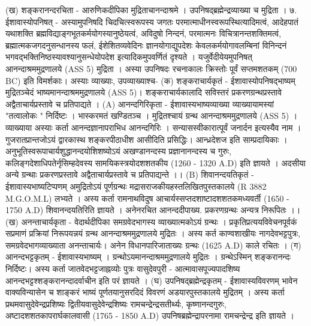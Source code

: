 (ख) शङ्करानन्दरचिता - आरुणिकदीपिका 
मुद्रिताचानन्दाश्रमे । उपनिषद्ब्रह्मेन्द्रव्याख्या च मुद्रिता । 
७. ईशावास्योपनिषत् - 
अस्यामुपनिषदि चिदचित्स्वरूपस्य जगतः परमात्माधीनस्वरूपस्थित्यादिमत्वं, आदेहपातं यथाशक्ति ब्रह्मविद्याङ्गभूतकर्मयोगस्यानुष्ठेयत्वं, अविदुषो निन्दनं, परमात्मनः विचित्रानन्तशक्तिमत्वं, ब्रह्मात्मकजगदनुसन्धानस्य फलं, ईशेशितव्यवेदिनः ज्ञानयोगाद्युपदेशः केवलकर्मयोगावलम्बिनां विनिन्दनं भगवद्भक्तिनिष्ठस्यावश्यानुसन्धेयोपदेश इत्यादिकमुपवर्णितं दृश्यते । यजुर्वेदीयेयमुपनिषत् आनन्दाश्रममुद्रणालये (ASS 5) मुद्रिता । अस्या उपनिषदः रचनाकालः क्रिस्तोः पूर्वं सप्तमशतकम् (700 BC) इति विमर्शकाः। अस्याः व्याख्याः, उपव्याख्याश्च- 
(क) शङ्कराचार्यकृतं - ईशावास्योपनिषद्भाष्यम् 
मुद्रितञ्चेदं भाष्यमानन्दाश्रममुद्रणालये (ASS 5)। शङ्कराचार्यकालादि सविस्तरं प्रकरणग्रन्थप्रस्तावे अद्वैताचार्यप्रस्तावे च प्रतिपाद्यते । 
(A) आनन्दगिरिकृता - ईशावास्यभाष्यव्याख्या
व्याख्यायामस्यां "तत्वालोकः " निर्दिष्टः । भास्करमतं खण्डितञ्च । मुद्रितश्चायं ग्रन्थ आनन्दाश्रममुद्रणालये (ASS 5) ।
व्याख्याया अस्याः कर्ता आनन्दज्ञानापराभिध आनन्दगिरिः । सन्यासस्वीकारात्पूर्वं जनार्दन इत्यस्यैव नाम । गुजरातप्रान्तजोऽयं द्वारकास्थ शङ्करपीठाधीश आसीदिति प्रसिद्धिः। आन्ध्रदेशज इति साम्प्रदायिकाः । अनुभूतिस्वरूपाचार्यशुद्धानन्दयोशिशष्योऽयं अखण्डानन्दस्य प्रज्ञानानन्दस्य च गुरुः, कलिङ्गदेशाधिपतेर्नृसिम्हदेवस्य सामयिकस्त्रयोदशशतकीय (1260 - 1320 A.D) इति ज्ञायते । अदसीया अन्ये ग्रन्थाः प्रकरणप्रस्तावे अद्वैताचार्यप्रस्तावे च प्रतिपाद्यन्ते ।। 
(B) शिवानन्दयतिकृतं - ईशावास्यभाष्यटिप्पणम् 
अमुद्रितोऽयं पूर्णग्रन्थः मद्रासराजकीयहस्तलिखितपुस्तकालये (R 3882 M.G.O.M.L) लभ्यते ।
अस्य कर्ता रामनाथविदुष आचार्यस्सप्तदशाष्टादशशतकमध्यवर्ती (1650 - 1750 A.D) शिवानन्दयतिरिति ज्ञायते । अनेनरचित आनन्ददीपाख्य. प्रकरणग्रन्थः अन्यत्र निरूपितः ।। 
(ख) अनन्ताचार्यकृता - वेदार्थदीपिका 
समग्रवेदभागस्य व्याख्यात्मकोऽयं ग्रन्थः । प्रकृतिप्रत्ययविवेचनपूर्वकं सप्रमाणं प्रक्रियां निरूपयन्नयं ग्रन्थ आनन्दाश्रममुद्रणालये मुद्रितः । 
अस्य कर्त काण्वशाखीयः नागदेवभट्टपुत्रः, समग्रवेदभागव्याख्याता अनन्ताचार्यः। अनेन विधानपारिजाताख्यः ग्रन्थः (1625 A.D) काले रचितः । 
(ग) आनन्दभट्टकृतम् - ईशावास्यभाष्यम् ।
ग्रन्थोऽयमानन्दाश्रममुद्रणालये मुद्रितः । ग्रन्थेऽस्मिन् शङ्करानन्दः निर्दिष्टः। अस्य कर्ता जातवेदभट्टजाह्नव्योः पुत्रः वासुदेवपुरी - आत्मावासपूज्यपादशिष्य आनन्दभट्टश्शङ्करानन्दादर्वाचीन इति परं ज्ञायते । 
(घ) उपनिषद्ब्रह्मेन्द्रकृतम् - ईशावास्यविवरणम् 
भावेन वाक्यविन्यासेन च शाङ्करं भाष्यं पूर्णतयानुसरदिदं विवरणं अडयारपुस्तकालये मुद्रितम् ।
अस्य कर्ता प्रथमवासुदेवेन्द्रप्रशिष्यः द्वितीयवासुदेवेन्द्रशिष्यः रामचन्द्रेन्द्रसतीर्थ्यः, कृष्णानन्दगुरुः, अष्टादशशतकापरार्घकालवासी (1765 - 1850 A.D) उपनिषब्रह्मेन्द्रापरनामा रामचन्द्रेन्द्र इति ज्ञायते । 
